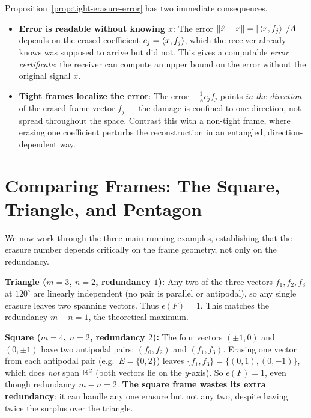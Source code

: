 \begin{keyidea}
Proposition~\ref{prop:tight-erasure-error} has two immediate
consequences.
\begin{itemize}
  \item \textbf{Error is readable without knowing $x$}: The error
        $\|\hat x-x\|=|\left\langle x, f_j \right\rangle|/A$ depends on the erased
        coefficient $c_j=\left\langle x, f_j \right\rangle$, which the receiver already
        knows was supposed to arrive but did not. This gives a
        computable \emph{error certificate}: the receiver can compute
        an upper bound on the error without the original signal $x$.
  \item \textbf{Tight frames localize the error}: The error
        $-\tfrac{1}{A}c_j f_j$ points \emph{in the direction} of the
        erased frame vector $f_j$ --- the damage is confined to one
        direction, not spread throughout the space. Contrast this with
        a non-tight frame, where erasing one coefficient perturbs the
        reconstruction in an entangled, direction-dependent way.
\end{itemize}
\end{keyidea}

\section{Comparing Frames: The Square, Triangle, and Pentagon}
\label{sec:frame-comparison}

We now work through the three main running examples, establishing that
the erasure number depends critically on the frame geometry, not only on
the redundancy.

\begin{examplebox}[title={Example 10.1: Triangle vs.\ square vs.\ pentagon in $\R^2$}]
\label{ex:square-triangle-comparison}
\textbf{Triangle ($m=3$, $n=2$, redundancy $1$):} Any two of the three
vectors $f_1,f_2,f_3$ at $120^\circ$ are linearly independent (no pair
is parallel or antipodal), so any single erasure leaves two
spanning vectors. Thus $\epsilon(F)=1$. This matches the redundancy
$m-n=1$, the theoretical maximum.

\textbf{Square ($m=4$, $n=2$, redundancy $2$):} The four vectors
$(\pm1,0)$ and $(0,\pm1)$ have two antipodal pairs: $(f_0,f_2)$ and
$(f_1,f_3)$. Erasing one vector from each antipodal pair (e.g.\ $E=
\{0,2\}$) leaves $\{f_1,f_3\}=\{(0,1),(0,-1)\}$, which does
\emph{not} span $\R^2$ (both vectors lie on the $y$-axis). So
$\epsilon(F)=1$, even though redundancy $m-n=2$. \textbf{The square
frame wastes its extra redundancy}: it can handle any one erasure but
not any two, despite having twice the surplus over the triangle.
\end{examplebox}

